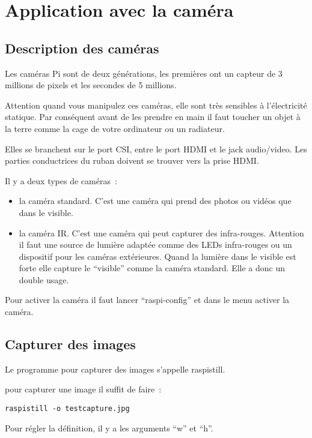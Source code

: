 \section{Application avec la caméra}

\subsection{Description des caméras}

Les caméras Pi sont de deux générations, les premières ont un capteur de 3 millions de pixels et les secondes de 5 millions.

Attention quand vous manipulez ces caméras, elle sont très sensibles à l'électricité statique. Par conséquent avant de les prendre en main il faut toucher un objet à la terre comme la cage de votre ordinateur ou un radiateur.

Elles se branchent sur le port CSI, entre le port HDMI et le jack audio/video. Les parties conductrices du ruban doivent se trouver vers la prise HDMI.

Il y a deux types de caméras~:
\begin{itemize}
	\item la caméra standard. C'est une caméra qui prend des photos ou vidéos que dans le visible.
	\item la caméra IR. C'est une caméra qui peut capturer des infra-rouges. Attention il faut une source de lumière adaptée comme des LEDs infra-rouges ou un dispositif pour les caméras extérieures. Quand la lumière dans le visible est forte elle capture le ``visible'' comme la caméra standard. Elle a donc un double usage.
\end{itemize}

Pour activer la caméra il faut lancer ``raspi-config'' et dans le menu activer la caméra.

\subsection{Capturer des images}

Le programme pour capturer des images s'appelle raspistill. 

pour capturer une image il suffit de faire~:

\begin{verbatim}
raspistill -o testcapture.jpg
\end{verbatim}

Pour régler la définition, il y a les arguments ``w'' et ``h''.

